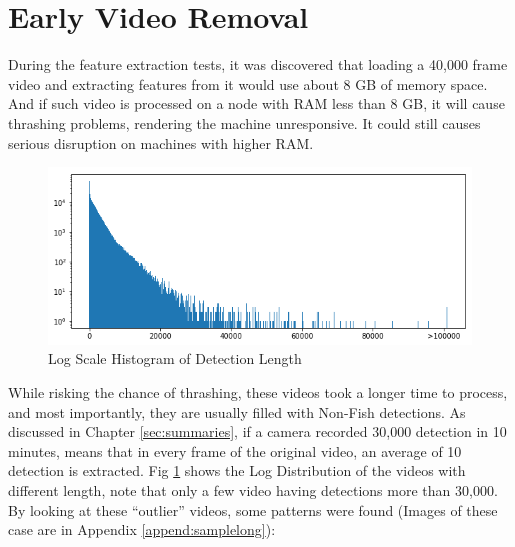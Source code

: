 \documentclass[bsc,logo,twoside,fullspacing,parskip]{infthesis}
\begin{document}
\section{Early Video Removal}
\label{sec:earlyremove}

During the feature extraction tests, it was discovered that loading a 40,000 frame video and extracting features from it would use about 8 GB of memory space. 
And if such video is processed on a node with RAM less than 8 GB, it will cause thrashing problems, rendering the machine unresponsive. 
It could still causes serious disruption on machines with higher RAM.

\begin{figure}[ht]
\centering
    \includegraphics[scale=0.40]{graph/frame_distribution.png}
    \caption{Log Scale Histogram of Detection Length}
    \label{fig:vidlength}
\end{figure}

While risking the chance of thrashing, these videos took a longer time to process, and most importantly, they are usually filled with Non-Fish detections. 
As discussed in Chapter \ref{sec:summaries}, if a camera recorded 30,000 detection in 10 minutes, means that in every frame of the original video, an average of 10 detection is extracted. 
Fig \ref{fig:vidlength} shows the Log Distribution of the videos with different length, note that only a few video having detections more than 30,000. 
By looking at these ``outlier'' videos, some patterns were found (Images of these case are in Appendix \ref{append:samplelong}):
\end{document}
